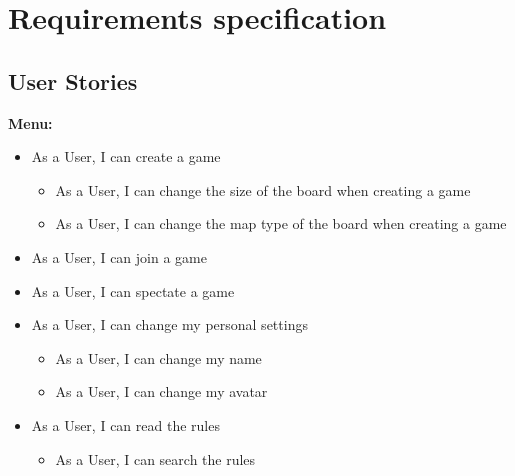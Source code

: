 \pagestyle{Uni}

\chapter{Requirements specification}

\section{User Stories}
\textbf{Menu:}
	\begin{itemize}
		\item As a User, I can create a game
		\begin{itemize}
			\item As a User, I can change the size of the board when creating a game
			\item As a User, I can change the map type of the board when creating a game
		\end{itemize}
		\item As a User, I can join a game
		\item As a User, I can spectate a game
		\item As a User, I can change my personal settings
		\begin{itemize}
			\item As a User, I can change my name
			\item As a User, I can change my avatar
		\end{itemize}
		\item As a User, I can read the rules
		\begin{itemize}
			\item As a User, I can search the rules
		\end{itemize}
	\end{itemize}

